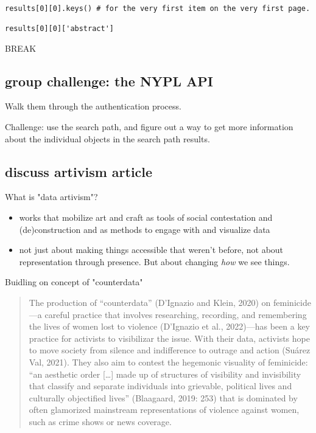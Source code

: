 \documentclass[11pt]{article}
\begin{document}
\begin{verbatim}

results[0][0].keys() # for the very first item on the very first page. 

results[0][0]['abstract']

\end{verbatim}


BREAK
\subsection{group challenge: the NYPL API}
\label{sec:org700b823}
Walk them through the authentication process. 

Challenge: use the search path, and figure out a way to get more
information about the individual objects in the search path results.

\subsection{discuss artivism article}
\label{sec:orgfab6cf4}

What is "data artivism"?
\begin{itemize}
\item works that mobilize art and craft as tools of social contestation
and (de)construction and as methods to engage with and visualize
data
\item not just about making things accessible that weren't before, not
about representation through presence. But about changing \emph{how} we
see things.
\end{itemize}

Buidling on concept of "counterdata"

\begin{quote}
The production of “counterdata” (D’Ignazio and Klein, 2020) on
feminicide—a careful practice that involves researching, recording,
and remembering the lives of women lost to violence (D’Ignazio et al.,
2022)—has been a key practice for activists to visibilizar the issue.
With their data, activists hope to move society from silence and
indifference to outrage and action (Suárez Val, 2021). They also aim
to contest the hegemonic visuality of feminicide: “an aesthetic order
[…] made up of structures of visibility and invisibility that classify
and separate individuals into grievable, political lives and
culturally objectified lives” (Blaagaard, 2019: 253) that is dominated
by often glamorized mainstream representations of violence against
women, such as crime shows or news coverage.
\end{quote}
\end{document}
